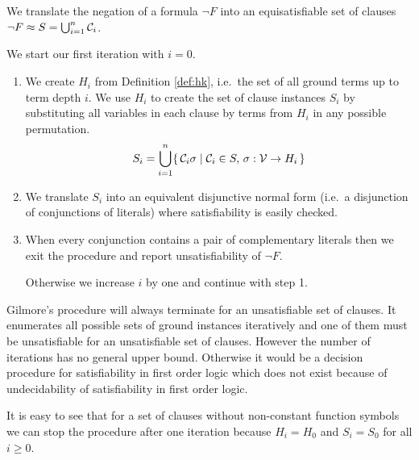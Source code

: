 \begin{procedure}
	We translate the negation of a formula $\lnot F$ into an equisatisfiable set of clauses 
	$\lnot F \approx S = \bigcup_{i=1}^{n} {\mathcal C}_i$.
	
	We start our first iteration with $i=0$.
	\begin{enumerate}
		
		\item We create $H_i$ from Definition \ref{def:hk}, 
		i.e.~the set of all ground terms up to term depth $i$. 
		We use $H_i$ to create the set of clause instances $S_i$ 
		by substituting all variables 
		in each clause by terms from $H_i$ in any possible permutation.
		\[ S_i = \bigcup_{i=1}^{n} 
		\{\,
			{\mathcal C}_i\sigma \mid {\mathcal C}_i \in S,\,\sigma: {\mathcal V}\to H_i
		\,\}
		\]
		
		\item We translate $S_i$ into an equivalent disjunctive normal form 
		(i.e.~a disjunction of conjunctions of literals)
		where satisfiability is easily checked.
		
		

		\item When every conjunction contains a pair of complementary literals 
		then we exit the procedure and report unsatisfiability of $\lnot F$.

Otherwise we increase $i$ by one and continue with step 1.
		
		
	\end{enumerate}
	
\end{procedure}

Gilmore's procedure will always terminate for an unsatisfiable set of clauses.
It enumerates all possible sets of ground instances iteratively
and one of them must be unsatisfiable for an unsatisfiable set of clauses. 
However the number of iterations has no general upper bound. 
Otherwise it would be a decision procedure for satisfiability in first order logic
which does not exist because of undecidability of satisfiability in first order logic.

It is easy to see that for a set of clauses without non-constant function symbols
we can stop the procedure after one iteration because $H_i = H_0$ and $S_i = S_0$ for all $i\geq0$.
%


